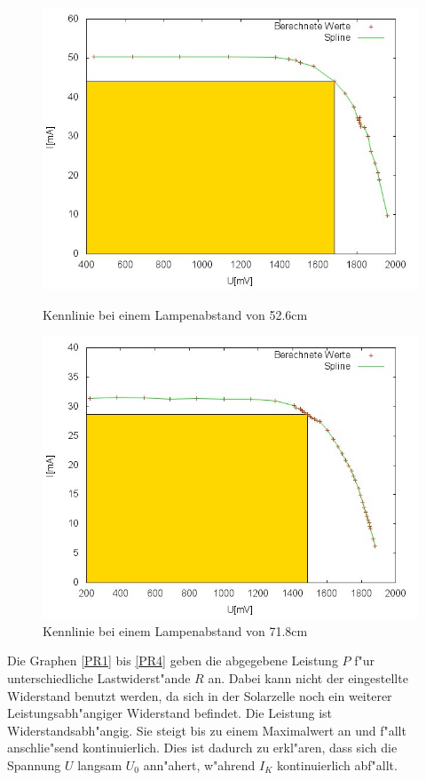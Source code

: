 \begin{figure}[htbp]
		\centering
		\includegraphics[width = 12cm]{img/526.jpg}
		\caption{Kennlinie bei einem Lampenabstand von 52.6cm}
		\label{UI3}

		\centering
		\includegraphics[width = 12cm]{img/718.jpg}
		\caption{Kennlinie bei einem Lampenabstand von 71.8cm}
		\label{UI4}
	\end{figure}

	Die Graphen \eqref{PR1} bis \eqref{PR4} geben die abgegebene Leistung $P$ f"ur unterschiedliche Lastwiderst"ande $R$ an.
	Dabei kann nicht der eingestellte Widerstand benutzt werden, da sich in der Solarzelle noch ein weiterer Leistungsabh"angiger Widerstand befindet.
	Die Leistung ist Widerstandsabh"angig.
	Sie steigt bis zu einem Maximalwert an und f"allt anschlie"send kontinuierlich.
	Dies ist dadurch zu erkl"aren, dass sich die Spannung $U$ langsam $U_0$ ann"ahert, w"ahrend $I_K$ kontinuierlich abf"allt.

